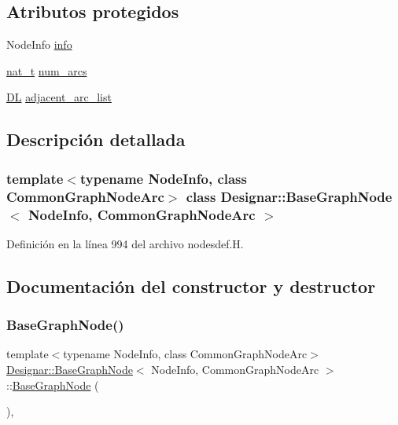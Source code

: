 \subsection*{Atributos protegidos}
\begin{DoxyCompactItemize}
\item 
Node\+Info \hyperlink{class_designar_1_1_base_graph_node_a78196723c561b3554cf8760ab2d902a8}{info}
\item 
\hyperlink{namespace_designar_aa72662848b9f4815e7bf31a7cf3e33d1}{nat\+\_\+t} \hyperlink{class_designar_1_1_base_graph_node_a035347b8e1ffaca5df73b42bef300e0f}{num\+\_\+arcs}
\item 
\hyperlink{class_designar_1_1_d_l}{DL} \hyperlink{class_designar_1_1_base_graph_node_a160dab27497d195ecdf93272a40a2cb5}{adjacent\+\_\+arc\+\_\+list}
\end{DoxyCompactItemize}


\subsection{Descripción detallada}
\subsubsection*{template$<$typename Node\+Info, class Common\+Graph\+Node\+Arc$>$\newline
class Designar\+::\+Base\+Graph\+Node$<$ Node\+Info, Common\+Graph\+Node\+Arc $>$}



Definición en la línea 994 del archivo nodesdef.\+H.



\subsection{Documentación del constructor y destructor}
\mbox{\label{class_designar_1_1_base_graph_node_a6eb12fac0ce731cb881c31b095493ef5}} 
\subsubsection{\texorpdfstring{Base\+Graph\+Node()}{BaseGraphNode()}\hspace{0.1cm}{\footnotesize\ttfamily [1/4]}}
{\footnotesize\ttfamily template$<$typename Node\+Info, class Common\+Graph\+Node\+Arc$>$ \\
\hyperlink{class_designar_1_1_base_graph_node}{Designar\+::\+Base\+Graph\+Node}$<$ Node\+Info, Common\+Graph\+Node\+Arc $>$\+::\hyperlink{class_designar_1_1_base_graph_node}{Base\+Graph\+Node} (\begin{DoxyParamCaption}{ }\end{DoxyParamCaption})\hspace{0.3cm}{\ttfamily [inline]}, {\ttfamily [protected]}}




